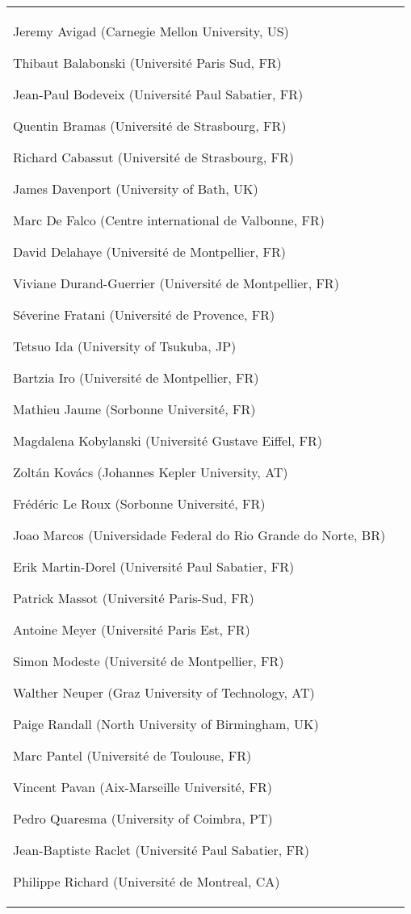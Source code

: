\begin{longtable}{|p{}|p{}|}
\begin{framed}
\begin{compactitem}
\item Jeremy Avigad (Carnegie Mellon University, US)
\item Thibaut Balabonski (Université Paris Sud, FR)
\item Jean-Paul Bodeveix (Université Paul Sabatier, FR)
\item Quentin Bramas (Université de Strasbourg, FR)
\item Richard Cabassut (Université de Strasbourg, FR)
\item James Davenport (University of Bath, UK)
\item Marc De Falco (Centre international de Valbonne, FR)
\item David Delahaye (Université de Montpellier, FR)
\item Viviane Durand-Guerrier (Université de Montpellier, FR)
\item Séverine Fratani (Université de Provence, FR)
\item Tetsuo Ida (University of Tsukuba, JP)
\item Bartzia Iro (Université de Montpellier, FR)
\item Mathieu Jaume (Sorbonne Université, FR)
\item Magdalena Kobylanski (Université Gustave Eiffel, FR)
\item Zoltán Kovács (Johannes Kepler University, AT)
\item Frédéric Le Roux (Sorbonne Université, FR)
\item Joao Marcos (Universidade Federal do Rio Grande do Norte, BR)
\item Erik Martin-Dorel (Université Paul Sabatier, FR)
\item Patrick Massot (Université Paris-Sud, FR)
\item Antoine Meyer (Université Paris Est, FR)
\item Simon Modeste (Université de Montpellier, FR)
\item Walther Neuper (Graz University of Technology, AT)
\item Paige Randall (North University of Birmingham, UK)
\item Marc Pantel (Université de Toulouse, FR)
\item Vincent Pavan (Aix-Marseille Université, FR)
\item Pedro Quaresma (University of Coimbra, PT)
\item Jean-Baptiste Raclet (Université Paul Sabatier, FR)
\item Philippe Richard (Université de Montreal, CA)

\end{compactitem}
\end{framed}
\end{longtable}
